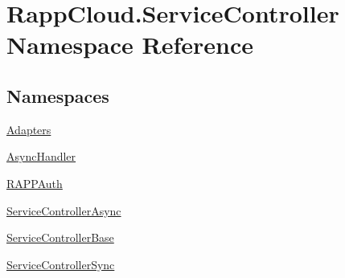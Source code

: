 \hypertarget{namespaceRappCloud_1_1ServiceController}{\section{Rapp\-Cloud.\-Service\-Controller Namespace Reference}
\label{namespaceRappCloud_1_1ServiceController}
}
\subsection*{Namespaces}
\begin{DoxyCompactItemize}
\item 
\hyperlink{namespaceRappCloud_1_1ServiceController_1_1Adapters}{Adapters}
\item 
\hyperlink{namespaceRappCloud_1_1ServiceController_1_1AsyncHandler}{Async\-Handler}
\item 
\hyperlink{namespaceRappCloud_1_1ServiceController_1_1RAPPAuth}{R\-A\-P\-P\-Auth}
\item 
\hyperlink{namespaceRappCloud_1_1ServiceController_1_1ServiceControllerAsync}{Service\-Controller\-Async}
\item 
\hyperlink{namespaceRappCloud_1_1ServiceController_1_1ServiceControllerBase}{Service\-Controller\-Base}
\item 
\hyperlink{namespaceRappCloud_1_1ServiceController_1_1ServiceControllerSync}{Service\-Controller\-Sync}
\end{DoxyCompactItemize}
